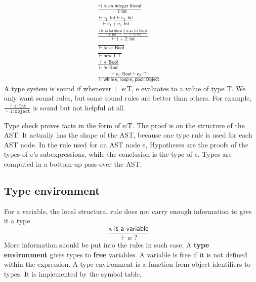 \begin{gather*}
\mathsf{\frac{\vdash\text{i is an integer literal}}{\vdash i:Int}}\\
\mathsf{\frac{\vdash e_1: Int\vdash e_2: Int}{\vdash e_1+e_2:Int}}\\
\mathsf{\frac{\frac{\text{1 is an int literal}}{\vdash 1:Int}\frac{\text{2 is an int literal}}{\vdash 2:Int}}{\vdash 1+2:Int}}\\
\mathsf{\frac{}{\vdash false : Bool}}\\
\mathsf{\frac{}{\vdash new\:T : T}}\\
\mathsf{\frac{\vdash e:Bool}{\vdash!e:Bool}}\\
\mathsf{\frac{\vdash e_1:Bool\vdash e_2: T}{\vdash while\:e_1\:loop\:e_2\:pool:Object}}
\end{gather*}
A type system is sound if whenever $\vdash$e:T, e evaluates to a value of type T. We only want sound rules, but some sound rules are better than others. For example, $\mathtt{\frac{\vdash i:Int}{\vdash i:Object}}$ is sound but not helpful at all.

Type check proves facts in the form of e:T. The proof is on the structure of the AST. It actually has the shape of the AST, because one type rule is used for each AST node. In the rule used for an AST node e, Hypotheses are the proofs of the types of e's subexpressions, while the conclusion is the type of e. Types are computed in a bottom-up pass over the AST.
\subsection{Type environment}
For a variable, the local structural rule does not carry enough information to give it a type. 
\begin{equation*}
\mathsf{\frac{\text{x is a variable}}{\vdash x : ?}}
\end{equation*}
More information should be put into the rules in such case. A {\bf type environment} gives types to {\bf free} variables. A variable is free if it is not defined within the expression. A type environment is a function from object identifiers to types. It is implemented by the symbol table.

